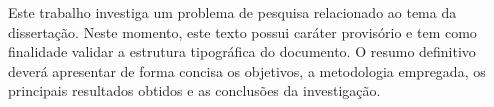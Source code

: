 Este trabalho investiga um problema de pesquisa relacionado ao tema da dissertação.
Neste momento, este texto possui caráter provisório e tem como finalidade validar
a estrutura tipográfica do documento. O resumo definitivo deverá apresentar de
forma concisa os objetivos, a metodologia empregada, os principais resultados
obtidos e as conclusões da investigação.

